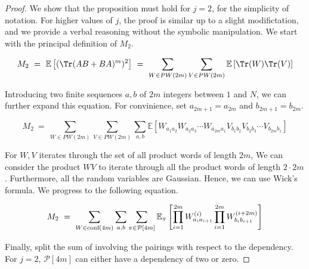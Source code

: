 \documentclass[12pt,reqno]{amsart}
\theoremstyle{plain} %
\theoremstyle{remark}
\theoremstyle{definition}
\newcommand{\E}{\mathbb E}
\begin{document}
\begin{proof}
    We show that the proposition must hold for $j = 2$, for the simplicity of 
    notation. For higher values of $j$, the proof is similar up to a slight modifictation, 
    and we provide a verbal reasoning without the symbolic manipulation.
    We start with the principal definition of $M_2$. 

    \begin{equation}
         M_2 \ = \ \E\left[(\Tr(AB + BA)^m)^2\right] 
         \ = \ 
            \sum_{W \in PW(2m)} \sum_{V \in PW(2m)}
            \E\left[\Tr(W)\Tr(V)\right]
    \end{equation}

    Introducing two finite sequences $a, b$ of $2m$ integers 
    between $1$ and $N$, we can further expand this equation. 
    For convinience, set $a_{2m + 1} = a_{2m}$ and \newline $b_{2m + 1} = b_{2m}$. 
    

    \begin{equation}
        M_2 \ =\ 
\sum_{W \in PW(2m)} \sum_{V \in PW(2m)}
        \sum_{a, b}
        \E\left[ W_{a_1a_2} W_{a_2a_3} \cdots W_{a_{2m}a_1}
            V_{b_1b_2} V_{b_2b_3} \cdots V_{b_{2m}b_1}
        \right]
    \end{equation}

For $W, V$ iterates through the set of all product words of length $2m$, 
We can consider the product $WV$ to iterate through all the product words 
of length $2 \cdot 2m$. Furthermore, all the random variables are Gaussian. 
Hence, we can use Wick's formula. We progress to the following equation. 

\begin{equation}
    M_2 \ = \ 
    \sum_{W \in \PW(4m)} \sum_{a, b} \sum_{\pi \in \mathcal{P}[4m]} 
    \E_\pi\left[
        \prod_{i = 1}^{2m} 
            W^{(i)}_{a_ia_{i + 1}}
        \prod_{i = 1}^{2m}
W^{(i + 2m)}_{b_ib_{i + 1}}
    \right] 
\end{equation}

Finally, split the sum of involving the pairings with respect to 
the dependency. For $j = 2$, $\mathcal{P}[4m]$ can either have a 
dependency of two or zero. 



\end{proof}
\end{document}
